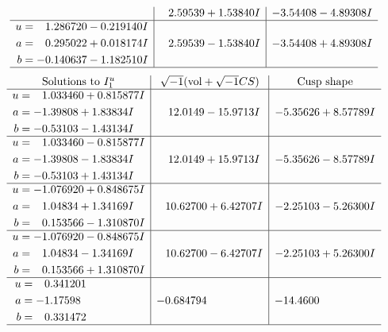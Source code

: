 \documentclass[1p]{elsarticle_modified}
\theoremstyle{definition}
\newcommand{\I}{\sqrt{-1}}
\begin{document}
$$\begin{array}{c|c|c}
 & \phantom{-}2.59539 + 1.53840 I & -3.54408 - 4.89308 I \\ \hline\begin{aligned}
u &= \phantom{-}1.286720 - 0.219140 I \\
a &= \phantom{-}0.295022 + 0.018174 I \\
b &= -0.140637 - 1.182510 I\end{aligned}
 & \phantom{-}2.59539 - 1.53840 I & -3.54408 + 4.89308 I\\
 \hline 
 \end{array}$$\newpage$$\begin{array}{c|c|c}  
\text{Solutions to }I^u_{1}& \I (\text{vol} + \sqrt{-1}CS) & \text{Cusp shape}\\
 \hline 
\begin{aligned}
u &= \phantom{-}1.033460 + 0.815877 I \\
a &= -1.39808 + 1.83834 I \\
b &= -0.53103 - 1.43134 I\end{aligned}
 & \phantom{-}12.0149 - 15.9713 I & -5.35626 + 8.57789 I \\ \hline\begin{aligned}
u &= \phantom{-}1.033460 - 0.815877 I \\
a &= -1.39808 - 1.83834 I \\
b &= -0.53103 + 1.43134 I\end{aligned}
 & \phantom{-}12.0149 + 15.9713 I & -5.35626 - 8.57789 I \\ \hline\begin{aligned}
u &= -1.076920 + 0.848675 I \\
a &= \phantom{-}1.04834 + 1.34169 I \\
b &= \phantom{-}0.153566 - 1.310870 I\end{aligned}
 & \phantom{-}10.62700 + 6.42707 I & -2.25103 - 5.26300 I \\ \hline\begin{aligned}
u &= -1.076920 - 0.848675 I \\
a &= \phantom{-}1.04834 - 1.34169 I \\
b &= \phantom{-}0.153566 + 1.310870 I\end{aligned}
 & \phantom{-}10.62700 - 6.42707 I & -2.25103 + 5.26300 I \\ \hline\begin{aligned}
u &= \phantom{-}0.341201\phantom{ +0.000000I} \\
a &= -1.17598\phantom{ +0.000000I} \\
b &= \phantom{-}0.331472\phantom{ +0.000000I}\end{aligned}
 & -0.684794\phantom{ +0.000000I} & -14.4600\phantom{ +0.000000I}\\
 \hline 
 \end{array}$$\newpage\newpage\renewcommand{\arraystretch}{1}
\end{document}
